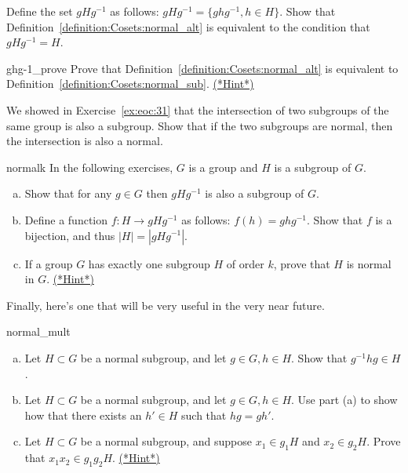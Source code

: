 \begin{exercise}
Define the set   $gHg^{-1}$ as follows: $gHg^{-1} = \{ghg^{-1}, h \in H\}$.  Show that Definition~\ref{definition:Cosets:normal_alt} is equivalent to the condition that  $gHg^{-1} = H$.  
\end{exercise}

\begin{exercise}{ghg-1_prove}
Prove that Definition~\ref{definition:Cosets:normal_alt} is equivalent to Definition~\ref{definition:Cosets:normal_sub}.
\hyperref[sec:Cosets:Hints]{(*Hint*)}
\end{exercise}


\begin{exercise}{}
We showed in Exercise~\ref{ex:eoc:31} that the intersection of two subgroups of the same group is also a subgroup.
Show that if the two subgroups are normal, then the intersection  is also a normal. 
\end{exercise}


\begin{exercise}{normalk}
In the following exercises, $G$ is a group and $H$ is a subgroup of $G$.
\begin{enumerate}[(a)]
\item
Show that for any $g \in G$ then $gHg^{-1}$ is also a subgroup of $G$.
\item
Define a function $f: H \rightarrow gHg^{-1}$ as follows:  $f(h) = ghg^{-1}$.
Show that $f$ is a bijection, and thus $|H| = |gHg^{-1}|$.
\item
If a group $G$ has exactly one subgroup $H$ of order $k$, prove that
$H$ is normal in $G$.
\hyperref[sec:Cosets:Hints]{(*Hint*)}
\end{enumerate}
\end{exercise}

Finally, here's one that will be very useful in the very near future.

\begin{exercise}{normal_mult}
\begin{enumerate}[(a)]
\item
Let $H \subset G$ be a normal subgroup, and let $g \in G, h \in H$. Show that $g^{-1}hg \in H$.
\item
Let $H \subset G$ be a normal subgroup, and let $g \in G, h \in H$. Use part (a) to show how that there exists an $h' \in H$ such that $hg = g h'$.
\item
Let $H \subset G$ be a normal subgroup, and suppose $x_1 \in g_1H$ and $x_2 \in g_2H$. Prove that $x_1x_2 \in g_1g_2H$.
\hyperref[sec:Cosets:Hints]{(*Hint*)}
\end{enumerate}
\end{exercise}  

